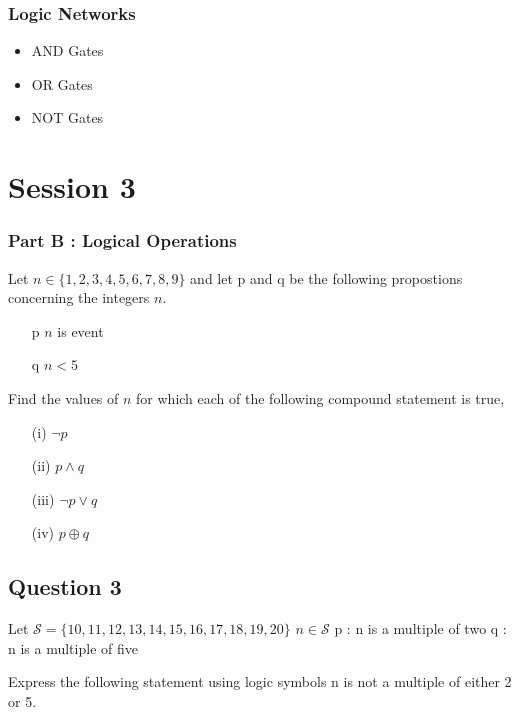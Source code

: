 \documentclass[]{report}
\begin{document}
\subsection*{Logic Networks}
\begin{itemize}
	\item AND Gates
	\item OR Gates
	\item NOT Gates
\end{itemize}

\newpage


\chapter{Session 3}


\subsection*{Part B : Logical Operations}
Let $n \in \{1,2,3,4,5,6,7,8,9\}$ and let p and q be the following propostions concerning 
the integers $n$.

\begin{itemize}
	\item[p] $n$ is event
	\item[q] $n<5$
\end{itemize}

Find the values of $n$ for which each of the following compound statement is true,

\begin{itemize}
	\item[(i)] $\neg p$
	\item[(ii)] $p \wedge q$
	\item[(iii)] $\neg p \vee q$ 
	\item[(iv)] $p \oplus q$
\end{itemize}

\section*{Question 3}

Let $\mathcal{S} = \{10,11,12,13,14,15,16,17,18,19,20\}$
$n  \in \mathcal{S}$
p : n is a multiple of two
q : n is a multiple of five

Express the following statement using logic symbols
n is not a multiple of either 2 or 5.
\end{document}
